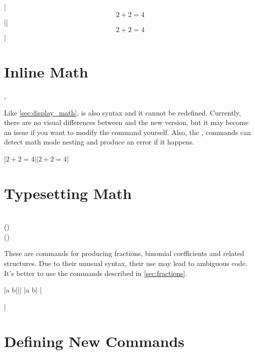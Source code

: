 \chto|$$ 2 + 2 = 4 $$||\[ 2 + 2 = 4 \]| %

\section{Inline Math}
\instead{
  \ai{\$}
} {
  \csi{(}, \csi{)}
}

Like \autoref{sec:display_math}, \ai{\$} is also  syntax
and it cannot be redefined. Currently, there are no visual differences between
\ai{\$} and the new version, but it may become an
issue if you want to modify the command yourself. Also, the \csi{(}, \csi{)} commands
can detect math mode nesting and produce an error if it happens.

\chto|$ 2 + 2 = 4 $||\( 2 + 2 = 4 \)|

\section{Typesetting Math}
 {
   \\
   () \\
   ()
}

These are  commands for producing fractions, binomial
coefficients and related structures. Due to their unusual syntax, their use may
lead to ambiguous code. It's better to use the commands described in
\autoref{sec:fractions}.
\begin{chktexignore}
\chto|{a \over b}|||
\chto|{a \choose b}|
|\usepackage{amsmath}
|
\end{chktexignore}

\section{Defining New Commands}\label{sec:def}
 {
   \\
   \\
}

